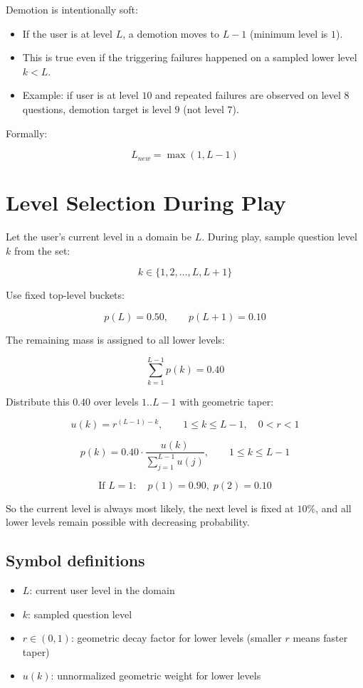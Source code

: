 \documentclass[11pt]{article}
\begin{document}
Demotion is intentionally soft:

\begin{itemize}[leftmargin=*]
    \item If the user is at level $L$, a demotion moves to $L-1$ (minimum level is $1$).
    \item This is true even if the triggering failures happened on a sampled lower level $k < L$.
    \item Example: if user is at level $10$ and repeated failures are observed on level $8$ questions, demotion target is level $9$ (not level $7$).
\end{itemize}

Formally:

\[
L_{new} = \max(1, L - 1)
\]

\section{Level Selection During Play}

Let the user's current level in a domain be $L$. During play, sample question level $k$ from the set:

\[
k \in \{1,2,\dots,L,L+1\}
\]

Use fixed top-level buckets:

\[
p(L)=0.50, \qquad p(L+1)=0.10
\]

The remaining mass is assigned to all lower levels:

\[
\sum_{k=1}^{L-1} p(k)=0.40
\]

Distribute this $0.40$ over levels $1..L-1$ with geometric taper:

\[
u(k)=r^{(L-1)-k}, \qquad 1 \le k \le L-1, \quad 0<r<1
\]

\[
p(k)=0.40\cdot\frac{u(k)}{\sum_{j=1}^{L-1} u(j)}, \qquad 1 \le k \le L-1
\]

\[
\text{If } L=1:\quad p(1)=0.90,\; p(2)=0.10
\]

So the current level is always most likely, the next level is fixed at $10\%$, and all lower levels remain possible with decreasing probability.

\subsection*{Symbol definitions}

\begin{itemize}[leftmargin=*]
    \item $L$: current user level in the domain
    \item $k$: sampled question level
    \item $r \in (0,1)$: geometric decay factor for lower levels (smaller $r$ means faster taper)
    \item $u(k)$: unnormalized geometric weight for lower levels
\end{itemize}
\end{document}
